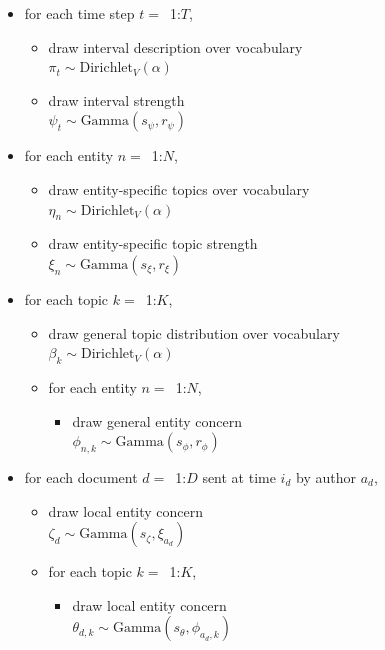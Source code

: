 \begin{figure}[htb]
\begin{mdframed}
\small
\begin{itemize}[leftmargin=*]
\item for each time step $t=$~1:$T$,
	\begin{itemize}[leftmargin=*]
	\item draw interval description over vocabulary \\$\pi_t \sim \mbox{Dirichlet}_V (\alpha)$
	\item draw interval strength \\$\psi_{t} \sim \mbox{Gamma}(s_\psi, r_\psi)$
	\end{itemize}
\item for each entity $n=$~1:$N$,
	\begin{itemize}[leftmargin=*]
	\item draw entity-specific topics over vocabulary \\$\eta_n \sim \mbox{Dirichlet}_V (\alpha)$
	\item draw entity-specific topic strength \\$\xi_{n} \sim \mbox{Gamma}(s_\xi, r_\xi)$
	\end{itemize}
\item for each topic $k=$~1:$K$,
	\begin{itemize}[leftmargin=*]
	\item draw general topic distribution over vocabulary \\$\beta_k \sim \mbox{Dirichlet}_V (\alpha)$
	\item for each entity $n=$~1:$N$,
		\begin{itemize}[leftmargin=*]
		\item draw general entity concern \\$\phi_{n,k} \sim \mbox{Gamma}(s_\phi, r_\phi)$
		\end{itemize}
	\end{itemize}
\item for each document $d=$~1:$D$ sent at time $i_d$ by author $a_d$,
	\begin{itemize}[leftmargin=*]
	\item draw local entity concern \\$\zeta_{d} \sim \mbox{Gamma}(s_\zeta, \xi_{a_d})$
	\item for each topic $k=$~1:$K$,
		\begin{itemize}[leftmargin=*]
			\item draw local entity concern \\$\theta_{d,k} \sim \mbox{Gamma}(s_\theta, \phi_{a_d,k})$

\end{itemize}
\end{itemize}
\end{itemize}
\end{mdframed}
\end{figure}
